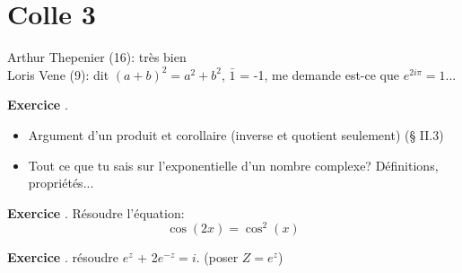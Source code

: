 \documentclass[10pt,a4paper]{article}
\newcounter{question}
\newcounter{exo}
\newenvironment{exo}{\vspace{0.5cm}\setcounter{question}{0}\addtocounter{exo}{1} \noindent \textbf{Exercice \theexo}. \normalsize }{\par}
\begin{document}
	\section*{Colle 3}
	\setcounter{exo}{0}
	Arthur Thepenier (16): très bien\\
	Loris Vene (9): dit $(a+b)^2 = a^2 + b^2$, $\bar{1}$ = -1, me demande est-ce que $e^{2i\pi} = 1$...\\
	
	\begin{exo}
		\begin{itemize}
			\item Argument d'un produit et corollaire (inverse et quotient seulement) (§ II.3)
			\item Tout ce que tu sais sur l'exponentielle d'un nombre complexe? Définitions, propriétés...
		\end{itemize}
	\end{exo}
	
	\begin{exo}
		Résoudre l'équation:
		$$\cos(2x) = \cos^2(x)$$
	\end{exo}
	
	\begin{exo}
		résoudre $e^z$ + 2$e^{-z} = i$. (poser $Z = e^z$)
	\end{exo}
\end{document}
